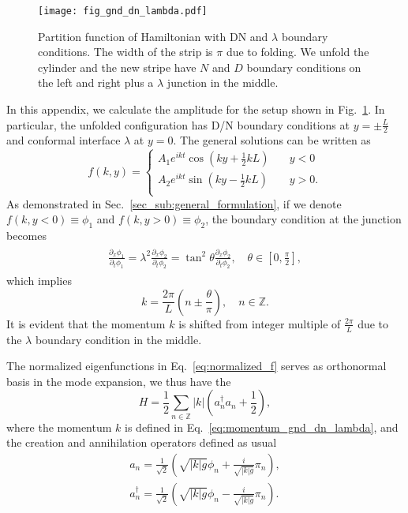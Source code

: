 
\begin{figure}[h]
\centering
\texttt{[image: fig\_gnd\_dn\_lambda.pdf]}
\caption{Partition function of Hamiltonian with DN and $\lambda$ boundary conditions. The width of the strip is $\pi$ due to folding. We unfold the cylinder and the new stripe have $N$ and $D$ boundary conditions on the left and right plus a $\lambda$ junction in the middle. }
\label{fig:Fig_gnd_dn_lambda}
\end{figure}

In this appendix, we calculate the amplitude for the setup shown in Fig.~\ref{fig:Fig_gnd_dn_lambda}. In particular, the unfolded configuration has D/N boundary conditions at $y = \pm \frac{L}{2}$ and conformal interface $\lambda$ at $y = 0$. The general solutions can be written as
\begin{equation}
\label{eq:normalized_f}
f(k, y) = 
\left\lbrace
\begin{aligned}
  A_1 e^{i kt} \cos\left(ky +\frac{1}{2}kL \right) &  \quad y < 0  \\
  A_2 e^{ikt}  \sin\left(ky - \frac{1}{2}kL \right) & \quad y > 0 .  \\
\end{aligned} \right. 
\end{equation}
As demonstrated in Sec.~\ref{sec_sub:general_formulation}, if we denote $f(k,y<0)\equiv\phi_1$ and $f(k,y>0)\equiv\phi_2$, the boundary condition at the junction becomes
\begin{eqnarray}\begin{aligned}
\frac{\partial_x \phi_1}{ \partial_t \phi_1} = \lambda^2 \frac{\partial_x \phi_2}{ \partial_t \phi_2} = \tan^2 \theta\frac{\partial_x \phi_2}{ \partial_t \phi_2}, \quad \theta \in \left[0,\frac{\pi}{2} \right]  ,
\end{aligned}\end{eqnarray}
which implies
\begin{equation}
\label{eq:momentum_gnd_dn_lambda}
k = \frac{2\pi}{L}\left( n \pm \frac{\theta}{\pi} \right),  \quad n\in\mathbb{Z}.
\end{equation}
It is evident that the momentum $k$ is shifted from integer multiple of $\frac{2\pi}{L}$ due to the $\lambda$ boundary condition in the middle. 

The normalized eigenfunctions in Eq.~\eqref{eq:normalized_f} serves as orthonormal basis in the mode expansion, we thus have the 
\begin{equation}
\label{eq:H_in_gnd_dn_lambda}
H = \frac{1}{2} \sum_{n \in \mathbb{Z} } |k|  \left(a^{\dagger}_n a_n + \frac{1}{2} \right) ,
\end{equation}
where the momentum $k$ is defined in Eq.~\eqref{eq:momentum_gnd_dn_lambda}, and the creation and annihilation operators defined as usual
\begin{equation}
\begin{aligned}
a_n = \frac{1}{\sqrt{2}} \left( \sqrt{ |k|g} \phi_n + \frac{i }{\sqrt{|k|g} }\pi_n  \right) ,\\
a^{\dagger}_n = \frac{1}{\sqrt{2}} \left( \sqrt{ |k|g} \phi_n - \frac{i }{\sqrt{|k|g} }\pi_n  \right) .\\
\end{aligned}
\end{equation}

